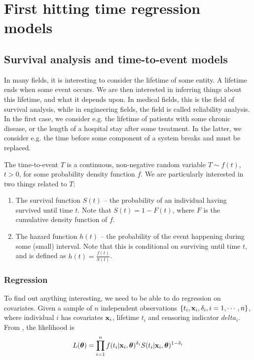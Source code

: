 \chapter{First hitting time regression models}

\section{Survival analysis and time-to-event models}\label{sec:survival}
In many fields, it is interesting to consider the lifetime of some entity. A lifetime ends when some event occurs. We are then interested in inferring things about this lifetime, and what it depends upon. In medical fields, this is the field of survival analysis, while in engineering fields, the field is called reliability analysis. In the first case, we consider e.g. the lifetime of patients with some chronic disease, or the length of a hospital stay after some treatment. In the latter, we consider e.g. the time before some component of a system breaks and must be replaced.

The time-to-event $T$ is a continuous, non-negative random variable $T\sim f(t)$, $t>0$, for some probability density function $f$. We are particularly interested in two things related to $T$:
\begin{enumerate}
\item{}The survival function $S(t)$ -- the probability of an individual having survived until time $t$. Note that $S(t)=1-F(t)$, where $F$ is the cumulative density function of $f$.
\item{}The hazard function $h(t)$ -- the probability of the event happening during some (small) interval. Note that this is conditional on surviving until time $t$, and is defined as $h(t)=\frac{f(t)}{S(t)}$.
\end{enumerate}

\subsection{Regression}\label{sec:surv-reg}
To find out anything interesting, we need to be able to do regression on covariates. Given a sample of $n$ independent observations $\{t_i,\mathbf{x}_i, \delta_i,i=1,\cdots,n\}$, where individual $i$ has covariates $\mathbf{x}_i$, lifetime $t_i$ and censoring indicator $delta_i$. From \cite[10]{caroni2017}, the likelihood is
\begin{equation}\label{eq:surv-lik}
    L(\boldsymbol{\theta})=\prod_{i=1}^n f(t_i|\mathbf{x}_i,\boldsymbol{\theta})^{\delta_i} S(t_i|\mathbf{x}_i,\boldsymbol{\theta})^{1-\delta_i}
\end{equation}

